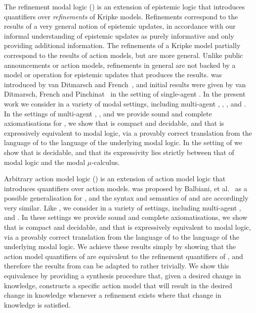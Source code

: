 The refinement modal logic (\logicRml{}) is an extension of epistemic logic that introduces quantifiers over {\em refinements} of Kripke models.
Refinements correspond to the results of a very general notion of epistemic updates, in accordance with our informal understanding of epistemic updates as purely informative and only providing additional information.
The refinements of a Kripke model partially correspond to the results of action models, but are more general.
Unlike public announcements or action models, refinements in general are not backed by a model or operation for epistemic updates that produces the results.
\logicRml{} was introduced by van Ditmarsch and French~\cite{vanditmarsch:2009}, and initial results were given by van Ditmarsch, French and Pinchinat~\cite{vanditmarsch:2010} in the setting of single-agent \classK{}.
In the present work we consider \logicRml{} in a variety of modal settings, including multi-agent \classK{}, \classKF{}, \classKFF{}, \classKD{} and \classS{}.
In the settings of multi-agent \classK{}, \classKFF{}, \classKD{} and \classS{} we provide sound and complete axiomatisations for \logicRml{}, we show that \logicRml{} is compact and decidable, and that \logicRml{} is expressively equivalent to modal logic, via a provably correct translation from the language of \logicRml{} to the language of the underlying modal logic.
In the setting of \classKF{} we show that \logicRml{} is decidable, and that its expressivity lies strictly between that of modal logic and the modal $\mu$-calculus.

Arbitrary action model logic (\logicAaml{}) is an extension of action model logic that introduces quantifiers over action models.
\logicAaml{} was proposed by Balbiani, et al.~\cite{balbiani:2007} as a possible generalisation for \logicApal{}, and the syntax and semantics of \logicAaml{} and \logicApal{} are accordingly very similar.
Like \logicRml{}, we consider \logicAaml{} in a variety of settings, including multi-agent \classK{}, \classKFF{} and \classS{}.
In these settings we provide sound and complete axiomatisations, we show that \logicAaml{} is compact and decidable, and that \logicAaml{} is expressively equivalent to modal logic, via a provably correct translation from the language of \logicAaml{} to the language of the underlying modal logic.
We achieve these results simply by showing that the action model quantifiers of \logicAaml{} are equivalent to the refinement quantifiers of \logicRml{}, and therefore the results from \logicRml{} can be adapted to \logicAaml{} rather trivially.
We show this equivalence by providing a synthesis procedure that, given a desired change in knowledge, constructs a specific action model that will result in the desired change in knowledge whenever a refinement exists where that change in knowledge is satisfied.

